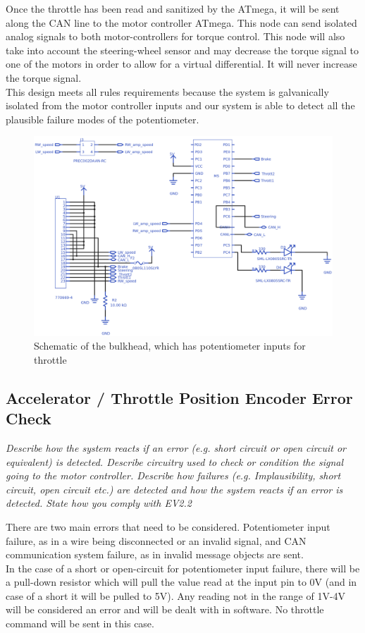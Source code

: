 \documentclass{article}
\begin{document}
    \textnormal{Once the throttle has been read and sanitized by the ATmega, it will be sent along the CAN line to the motor controller ATmega. This node can send isolated analog signals to both motor-controllers for torque control. This node will also take into account the steering-wheel sensor and may decrease the torque signal to one of the motors in order to allow for a virtual differential. It will never increase the torque signal.}\\

    \textnormal{This design meets all rules requirements because the system is galvanically isolated from the motor controller inputs and our system is able to detect all the plausible failure modes of the potentiometer.}

    \begin{figure}[H]
        \centering
        \includegraphics[width = 0.4 \textwidth]{Bulkheadschem}
        \caption{Schematic of the bulkhead, which has potentiometer inputs for throttle}
        \label{bulkheadschem}
    \end{figure}

    \subsection{Accelerator / Throttle Position Encoder Error Check}

    \textit{Describe how the system reacts if an error (e.g. short circuit or open circuit or equivalent) is detected. Describe circuitry used to check or condition the signal going to the motor controller. Describe how failures (e.g. Implausibility, short circuit, open circuit etc.) are detected and how the system reacts if an error is detected. State how you comply with EV2.2}


    \textnormal{
    There are two main errors that need to be considered. Potentiometer input failure, as in a wire being disconnected or an invalid signal, and CAN communication system failure, as in invalid message objects are sent.
    }\\

    \textnormal{
    In the case of a short or open-circuit for potentiometer input failure, there will be a pull-down resistor which will pull the value read at the input pin to 0V (and in case of a short it will be pulled to 5V). Any reading not in the range of 1V-4V will be considered an error and will be dealt with in software. No throttle command will be sent in this case.
    }\\
\end{document}
